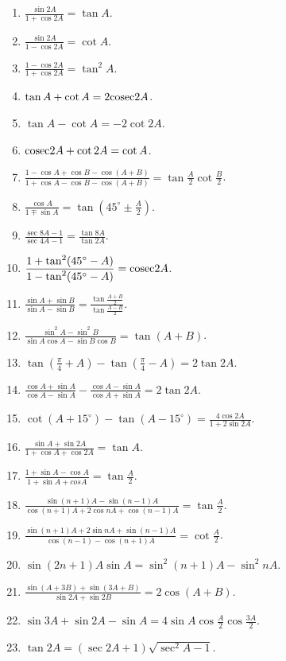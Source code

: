 \begin{enumerate}[resume]
\item $\frac{\sin 2A}{1 + \cos 2A} = \tan A$.
\item $\frac{\sin 2A}{1 - \cos 2A} = \cot A$.
\item $\frac{1 - \cos 2A}{1 + \cos 2A} = \tan^2A$.
\item $\tan A + \cot A = 2{\rm cosec} 2A$.
\item $\tan A - \cot A = -2\cot2A$.
\item ${\rm cosec} 2A + \cot 2A = \cot A$.
\item $\frac{1 - \cos A + \cos B - \cos(A + B)}{1 + \cos A - \cos B - \cos(A + B)} = \tan\frac{A}{2}\cot\frac{B}{2}$.
\item $\frac{\cos A}{1 \mp \sin A} = \tan\left(45^\circ \pm \frac{A}{2}\right)$.
\item $\frac{\sec 8A - 1}{\sec 4A - 1} = \frac{\tan 8A}{\tan 2A}$.
\item $\frac{1 + \tan^2(45^\circ - A)}{1 - \tan^2(45^\circ - A)} = {\rm cosec} 2A$.
\item $\frac{\sin A + \sin B}{\sin A - \sin B} = \frac{\tan \frac{A + B}{2}}{\tan \frac{A - B}{2}}$.
\item $\frac{\sin^2A - \sin^2B}{\sin A\cos A - \sin B\cos B} = \tan(A + B)$.
\item $\tan\left(\frac{\pi}{4} + A\right) - \tan\left(\frac{\pi}{4} - A\right) = 2\tan 2A$.
\item $\frac{\cos A + \sin A}{\cos A - \sin A} - \frac{\cos A - \sin A}{\cos A + \sin A} = 2\tan 2A$.
\item $\cot (A + 15^\circ) - \tan(A - 15^\circ) = \frac{4\cos 2A}{1 + 2\sin 2A}$.
\item $\frac{\sin A + \sin2A}{1 + \cos A + \cos 2A} = \tan A$.
\item $\frac{1 + \sin A - \cos A }{1 + \sin A + cos A} = \tan \frac{A}{2}$.
\item $\frac{\sin(n + 1)A - \sin(n - 1)A}{\cos(n + 1)A + 2\cos nA + \cos(n - 1)A} = \tan \frac{A}{2}$.
\item $\frac{\sin(n + 1)A + 2\sin nA + \sin(n - 1)A}{\cos(n - 1) - \cos(n + 1)A} = \cot \frac{A}{2}$.
\item $\sin(2n + 1)A\sin A = \sin^2(n + 1)A - \sin^2nA$.
\item $\frac{\sin(A + 3B) + \sin(3A + B)}{\sin 2A + \sin 2B} = 2\cos(A + B)$.
\item $\sin 3A + \sin 2A - \sin A = 4\sin A\cos \frac{A}{2}\cos \frac{3A}{2}$.
\item $\tan 2A = (\sec 2A + 1)\sqrt{\sec^2A - 1}$.

\end{enumerate}
